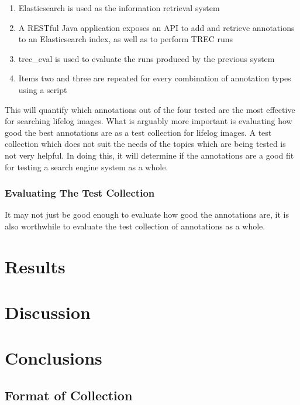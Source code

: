 \documentclass[12pt,a4paper]{article}
\begin{document}
\begin{enumerate}
    \item Elasticsearch is used as the information retrieval system
    \item A RESTful Java application exposes an API to add and retrieve annotations to an Elasticsearch index, as well as to perform TREC runs
    \item trec\_eval is used to evaluate the runs produced by the previous system
    \item Items two and three are repeated for every combination of annotation types using a script
\end{enumerate}

This will quantify which annotations out of the four tested are the most effective for searching lifelog images. What is arguably more important is evaluating how good the best annotations are as a test collection for lifelog images. A test collection which does not suit the needs of the topics which are being tested is not very helpful. In doing this, it will determine if the annotations are a good fit for testing a search engine system as a whole.

\subsubsection{Evaluating The Test Collection}

It may not just be good enough to evaluate how good the annotations are, it is also worthwhile to evaluate the test collection of annotations as a whole.

\section{Results}

\section{Discussion}

\section{Conclusions}

\begin{appendices}
\renewcommand\thetable{\thesection\arabic{table}}
\renewcommand\thefigure{\thesection\arabic{figure}}
\section{Format of Collection} \label{app:format}

\end{appendices}



\end{document}
